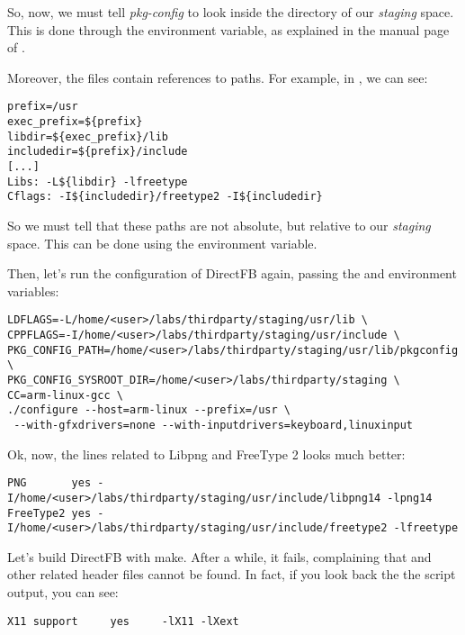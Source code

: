 So, now, we must tell {\em pkg-config} to look inside the
 directory of our {\em staging} space. This
is done through the  environment variable, as
explained in the manual page of .

Moreover, the  files contain references to paths. For
example, in
,
we can see:

\begin{verbatim}
prefix=/usr
exec_prefix=${prefix}
libdir=${exec_prefix}/lib
includedir=${prefix}/include
[...]
Libs: -L${libdir} -lfreetype
Cflags: -I${includedir}/freetype2 -I${includedir}
\end{verbatim}

So we must tell  that these paths are not absolute,
but relative to our {\em staging} space. This can be done using the
 environment variable.

Then, let's run the configuration of DirectFB again, passing the
 and  environment
variables:

\small
\begin{verbatim}
LDFLAGS=-L/home/<user>/labs/thirdparty/staging/usr/lib \
CPPFLAGS=-I/home/<user>/labs/thirdparty/staging/usr/include \
PKG_CONFIG_PATH=/home/<user>/labs/thirdparty/staging/usr/lib/pkgconfig \
PKG_CONFIG_SYSROOT_DIR=/home/<user>/labs/thirdparty/staging \
CC=arm-linux-gcc \
./configure --host=arm-linux --prefix=/usr \
 --with-gfxdrivers=none --with-inputdrivers=keyboard,linuxinput
\end{verbatim}
\normalsize

Ok, now, the lines related to Libpng and FreeType 2 looks much better:

\footnotesize
\begin{verbatim}
PNG       yes -I/home/<user>/labs/thirdparty/staging/usr/include/libpng14 -lpng14
FreeType2 yes -I/home/<user>/labs/thirdparty/staging/usr/include/freetype2 -lfreetype
\end{verbatim}
\normalsize

Let's build DirectFB with make. After a while, it fails, complaining
that \code{X11/Xlib.h} and other related header files cannot be
found. In fact, if you look back the the \code{./configure} script
output, you can see:

\begin{verbatim}
X11 support		yes		-lX11 -lXext
\end{verbatim}

